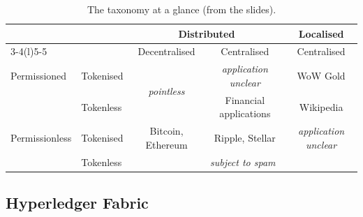 \begin{table}[H]
\centering
\caption{The taxonomy at a glance (from the slides).}
\label{tab:dlt-taxonomy}
\small
\begin{tabular}{@{}ll ccc@{}}
\toprule
 & & \multicolumn{2}{c}{Distributed} & Localised \\
\cmidrule(lr){3-4}\cmidrule(l){5-5}
 & & Decentralised & Centralised & Centralised \\
\midrule
Permissioned & Tokenised & \multirow{2}{*}{\emph{pointless}} & \emph{application unclear} & WoW Gold \\
 & Tokenless & & Financial applications & Wikipedia \\
\midrule
Permissionless & Tokenised & Bitcoin, Ethereum & Ripple, Stellar & \emph{application unclear} \\
 & Tokenless & \multicolumn{3}{c}{\emph{subject to spam}} \\
\bottomrule
\end{tabular}
\end{table}

\subsection{Hyperledger Fabric}

